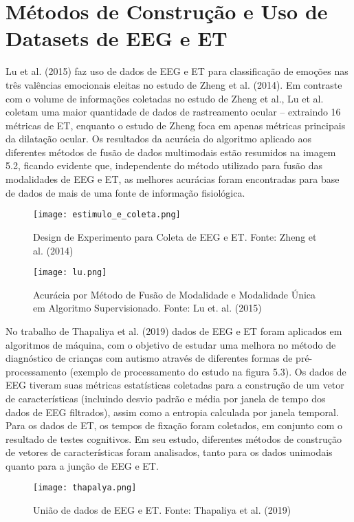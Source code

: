 \chapter{Métodos de Construção e Uso de Datasets de EEG e ET}


Lu et al. (2015) faz uso de dados de EEG e ET para classificação de emoções nas três 
valências emocionais eleitas no estudo de Zheng et al. (2014). Em contraste com o volume de 
informações coletadas no estudo de Zheng et al., Lu et al. coletam uma 
maior quantidade de dados de rastreamento ocular – 
extraindo 16 métricas de ET, enquanto o estudo de Zheng foca em apenas 
métricas principais da dilatação ocular. 
Os resultados da acurácia do algoritmo aplicado aos diferentes métodos de fusão 
de dados multimodais estão resumidos na imagem 5.2, 
ficando evidente que, independente do método utilizado para fusão das modalidades de EEG e ET, 
as melhores acurácias foram encontradas para base de dados de mais de uma fonte de informação 
fisiológica. 


\begin{figure}
      \centering
      \texttt{[image: estimulo\_e\_coleta.png]}
      \caption{Design de Experimento para Coleta de EEG e ET. Fonte: Zheng et al. (2014)}
\end{figure}


\begin{figure}
      \centering
      \texttt{[image: lu.png]}
      \caption{Acurácia por Método de Fusão de Modalidade e Modalidade Única em Algoritmo Supervisionado. Fonte: Lu et. al. (2015)}
\end{figure}

No trabalho de Thapaliya et al. (2019) dados de EEG e ET foram aplicados em algoritmos de máquina, 
com o objetivo de estudar uma melhora no método de diagnóstico de crianças com autismo através de 
diferentes formas de pré-processamento (exemplo de processamento do estudo na figura 5.3). 
Os dados de EEG tiveram suas métricas estatísticas coletadas para a construção de um vetor de características 
(incluindo desvio padrão e média por janela de tempo dos dados de EEG filtrados), assim como a entropia calculada 
por janela temporal. Para os dados de ET, os tempos de fixação foram coletados, em conjunto com o resultado de testes cognitivos. 
Em seu estudo, diferentes métodos de construção de vetores de características foram analisados, 
tanto para os dados unimodais quanto para a junção de EEG e ET. 


\begin{figure}[h]
      \centering
      \texttt{[image: thapalya.png]}
      \caption{União de dados de EEG e ET. Fonte: Thapaliya et al. (2019)}
\end{figure}

